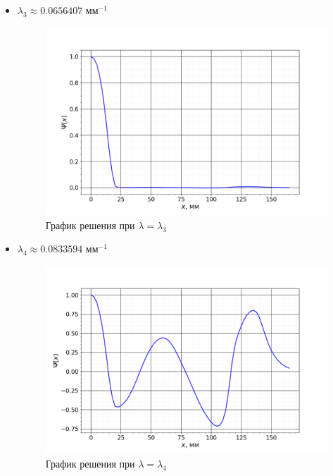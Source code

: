\begin{itemize}
		
			\item $\lambda_3 \approx 0.0656407$ мм$^{-1}$
			\begin{figure}[h!]
				\centering
				\includegraphics[width=0.92\linewidth]{Pictures/Normal/3.png}
				\caption{График решения при $\lambda = \lambda_3$}
			\end{figure}
		
			\newpage
			\item $\lambda_4 \approx 0.0833594$ мм$^{-1}$
			\begin{figure}[h!]
				\centering
				\includegraphics[width=0.92\linewidth]{Pictures/Normal/4.png}
				\caption{График решения при $\lambda = \lambda_4$}
			\end{figure}
		

\end{itemize}
